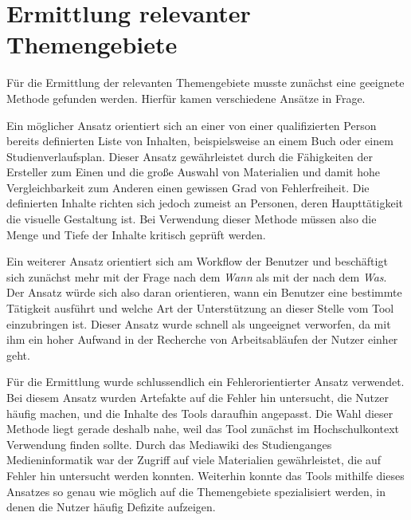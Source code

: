 
\chapter{Ermittlung relevanter Themengebiete} %

\label{Ermittlung} %



Für die Ermittlung der relevanten Themengebiete musste zunächst eine geeignete Methode gefunden werden. Hierfür kamen verschiedene Ansätze in Frage.

Ein möglicher Ansatz orientiert sich an einer von einer qualifizierten Person bereits definierten Liste von Inhalten, beispielsweise an einem Buch oder einem Studienverlaufsplan.
Dieser Ansatz gewährleistet durch die Fähigkeiten der Ersteller zum Einen und die große Auswahl von Materialien und damit hohe Vergleichbarkeit zum Anderen einen gewissen Grad von Fehlerfreiheit.
Die definierten Inhalte richten sich jedoch zumeist an Personen, deren Haupttätigkeit die visuelle Gestaltung ist. Bei Verwendung dieser Methode müssen also die Menge und Tiefe der Inhalte kritisch geprüft werden.

Ein weiterer Ansatz orientiert sich am Workflow der Benutzer und beschäftigt sich zunächst mehr mit der Frage nach dem \textit{Wann} als mit der nach dem \textit{Was}. Der Ansatz würde sich also daran orientieren, wann ein Benutzer eine bestimmte Tätigkeit ausführt und welche Art der Unterstützung an dieser Stelle vom Tool einzubringen ist.
Dieser Ansatz wurde schnell als ungeeignet verworfen, da mit ihm ein hoher Aufwand in der Recherche von Arbeitsabläufen der Nutzer einher geht.

Für die Ermittlung wurde schlussendlich ein Fehlerorientierter Ansatz verwendet. Bei diesem Ansatz wurden Artefakte auf die Fehler hin untersucht, die Nutzer häufig machen, und die Inhalte des Tools daraufhin angepasst.
Die Wahl dieser Methode liegt gerade deshalb nahe, weil das Tool zunächst im Hochschulkontext Verwendung finden sollte. Durch das Mediawiki des Studienganges Medieninformatik war der Zugriff auf viele Materialien gewährleistet, die auf Fehler hin untersucht werden konnten. Weiterhin konnte das Tools mithilfe dieses Ansatzes so genau wie möglich auf die Themengebiete spezialisiert werden, in denen die Nutzer häufig Defizite aufzeigen.


